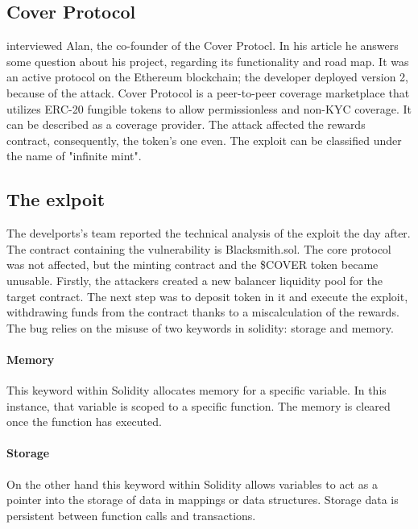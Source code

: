 \subsection{Cover Protocol}
\label{sec:CoverProtocol:Presentation}

\citet{CoverProtocol} interviewed Alan, the co-founder of the Cover Protocl. In his article he answers some question about his project, regarding its functionality and road map. 
It was an active protocol on the Ethereum blockchain; the developer deployed version 2,  because of the attack. 
Cover Protocol is a peer-to-peer coverage marketplace that utilizes ERC-20 fungible tokens to allow permissionless and non-KYC coverage. 
It can be described as a coverage provider.
The attack affected the rewards contract, consequently, the token's one even.  
The exploit can be classified under the name of "infinite mint".

\subsection{The exlpoit}
\label{sec:CoverProtocol:Exploit}
The develports's team reported \citep{CoverProtocolPostMortem} the technical analysis of the exploit the day after.
The contract containing the vulnerability is Blacksmith.sol. The core protocol was not affected, 
but the minting contract and the \$COVER token became unusable.
Firstly, the attackers created a new balancer liquidity pool for the target contract. The next step was to deposit token in it and execute the exploit, 
withdrawing funds from the contract thanks to a miscalculation of the rewards.
The bug relies on the misuse of two keywords in solidity: storage and memory. 

\paragraph{Memory} This keyword within Solidity allocates memory for a specific variable. 
In this instance, that variable is scoped to a specific function. 
The memory is cleared once the function has executed.

\paragraph{Storage} On the other hand this keyword within Solidity allows variables to act as a pointer into the storage of data in mappings or data structures. 
Storage data is persistent between function calls and transactions. 

